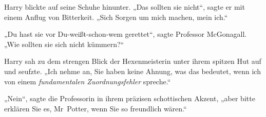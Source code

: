 Harry blickte auf seine Schuhe hinunter. „Das sollten sie nicht“, sagte er mit einem Anflug von Bitterkeit. „Sich Sorgen um mich machen, mein ich.“

„Du hast sie vor Du-weißt-schon-wem gerettet“, sagte Professor McGonagall. „Wie sollten sie sich nicht kümmern?“

Harry sah zu dem strengen Blick der Hexenmeisterin unter ihrem spitzen Hut auf und seufzte. „Ich nehme an, Sie haben keine Ahnung, was das bedeutet, wenn ich von einem \emph{fundamentalen Zuordnungsfehler} spreche.“

„Nein“, sagte die Professorin in ihrem präzisen schottischen Akzent, „aber bitte erklären Sie es, Mr~Potter, wenn Sie so freundlich wären.“

